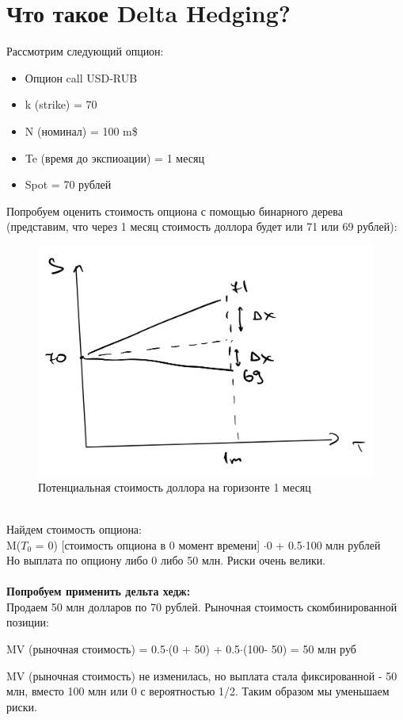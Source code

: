 \documentclass{article}
\begin{document}
\section{Что такое Delta Hedging? }
Рассмотрим следующий опцион:
\begin{itemize} 
\item{Опцион call USD-RUB}
\item{k (strike) = 70}
\item{N (номинал) = 100 m\$}
\item{Te (время до экспиоации) = 1 месяц}
\item{Spot = 70 рублей} 
\end{itemize}
Попробуем оценить стоимость опциона с помощью бинарного дерева (представим, что через 1 месяц стоимость доллора будет или 71 или 69 рублей):
\begin{figure}[h]
\centering
\includegraphics[width=0.8\linewidth]{Graph_1.png}
\caption{Потенциальная стоимость доллора на горизонте 1 месяц}
\label{fig:mpr}
\end{figure}
\\
Найдем стоимость опциона:
\\
M($T_{0}$ = 0) [стоимость опциона в 0 момент времени] $\cdot$0 + 0.5$\cdot$100 млн рублей \\
Но выплата по опциону либо 0 либо 50 млн. Риски очень велики.\\\\
\textbf{Попробуем применить дельта хедж:} \\
Продаем 50 млн долларов  по 70 рублей. Рыночная стоимость скомбинированной позиции: \\
\begin{center}
    MV (рыночная стоимость) = 0.5$\cdot$(0 + 50) + 0.5$\cdot$(100- 50) = 50 млн руб 
\end{center}
MV (рыночная стоимость) не изменилась, но выплата стала фиксированной - 50 млн, вместо 100 млн или 0 с вероятностью 1/2. Таким образом мы уменьшаем риски. \\\\
\end{document}
